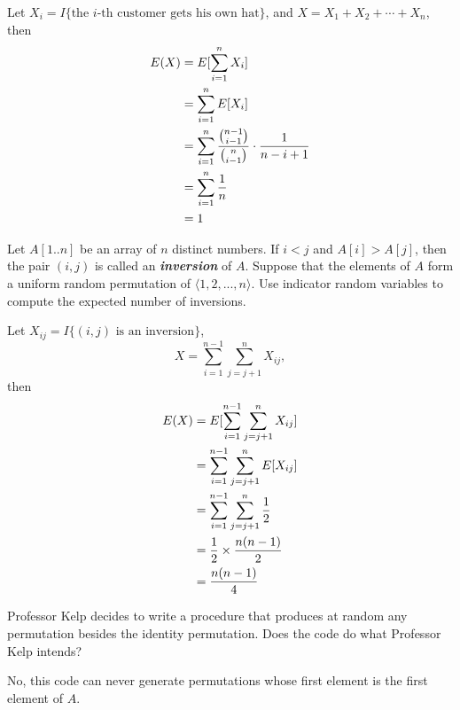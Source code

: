 \documentclass[12pt, a4paper, UTF8]{ctexart}
\begin{document}
\begin{solution}
  Let $X_{i} = I\{\text{the $i$-th customer gets his own hat}\}$, and $X = X_{1} + X_{2} + \cdots + X_{n}$, 
  then
  \begin{align}
      E(X) & = E[\sum_{i=1}^{n} X_{i}] \notag \\
           & = \sum_{i=1}^{n} E[X_{i}] \notag \\
           & = \sum_{i=1}^{n} \frac{\binom{n-1}{i-1}}{\binom{n}{i-1}}\cdot\frac{1}{n-i+1} \notag \\
           & = \sum_{i=1}^{n} \frac{1}{n} \notag \\
           & = 1 \notag
  \end{align}
\end{solution}

\begin{problem}[TC: 5.2-5]
  Let $A[1..n]$ be an array of $n$ distinct numbers. If $i < j$ and $A[i] > A[j]$, 
  then the pair $(i,j)$ is called an \textbf{\textsl{inversion}} of $A$. Suppose 
  that the elements of $A$ form a uniform random permutation of $\langle 1,2,...,n \rangle$. 
  Use indicator random variables to compute the expected number of inversions.
\end{problem}

\begin{solution}
  Let $X_{ij} = I\{\text{$(i,j)$ is an inversion}\}$,
  \[X = \sum_{i=1}^{n-1}\sum_{j=j+1}^{n} X_{ij},\]
  then
  \begin{align}
      E(X) & = E[\sum_{i=1}^{n-1}\sum_{j=j+1}^{n} X_{ij}] \notag \\
           & = \sum_{i=1}^{n-1}\sum_{j=j+1}^{n} E[X_{ij}] \notag \\
           & = \sum_{i=1}^{n-1}\sum_{j=j+1}^{n} \frac{1}{2} \notag \\
           & = \frac{1}{2} \times \frac{n(n-1)}{2} \notag \\
           & = \frac{n(n-1)}{4} \notag
  \end{align}
\end{solution}

\begin{problem}[TC: 5.3-2]
  Professor Kelp decides to write a procedure that produces at random any permutation 
  besides the identity permutation. Does the code do what Professor Kelp intends?
\end{problem}

\begin{solution}
  No, this code can never generate permutations whose first element is the first 
  element of $A$.
\end{solution}
\end{document}
